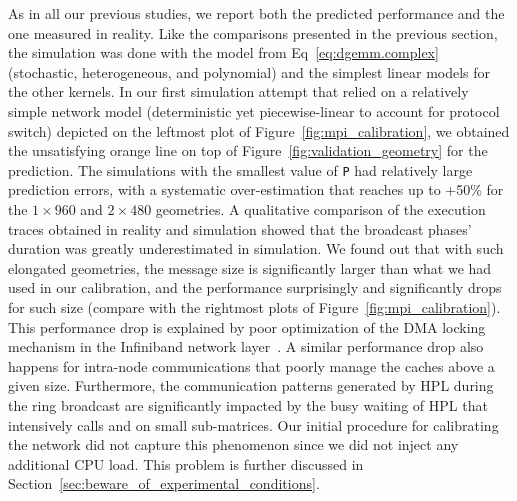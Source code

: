         As in all our previous studies, we report both the predicted performance and the one measured in reality. Like
        the comparisons presented in the previous section, the simulation was done with the \dgemm model from
        Eq~\eqref{eq:dgemm.complex} (stochastic, heterogeneous, and polynomial) and the simplest linear models for the
        other kernels.  In our first simulation attempt that relied on a relatively simple network model (deterministic
        yet piecewise-linear to account for protocol switch) depicted on the leftmost plot of
        Figure~\ref{fig:mpi_calibration}, we obtained the unsatisfying orange line on top of
        Figure~\ref{fig:validation_geometry} for the prediction.  The simulations with the smallest value of \texttt{P}
        had relatively large prediction errors, with a systematic over-estimation that reaches up to +50\% for the
        \(1\times960\) and \(2\times480\) geometries.  A qualitative comparison of the execution traces obtained in
        reality and simulation showed that the broadcast phases' duration was greatly underestimated in simulation. We
        found out that with such elongated geometries, the message size is significantly larger than what we had used in
        our calibration, and the performance surprisingly and significantly drops for such size (compare with the
        rightmost plots of Figure~\ref{fig:mpi_calibration}). This performance drop is explained by poor optimization of
        the DMA locking mechanism in the Infiniband network layer~\cite{denis:inria-00586015}. A similar performance drop
        also happens for intra-node communications that poorly manage the caches above a given size. Furthermore, the
        communication patterns generated by HPL during the ring broadcast are significantly impacted by the busy waiting
        of HPL that intensively calls \iprobe and \dgemm on small sub-matrices. Our initial
        procedure for calibrating the network did not capture this phenomenon since we did not inject any additional CPU
        load. This problem is further discussed in Section~\ref{sec:beware_of_experimental_conditions}.

